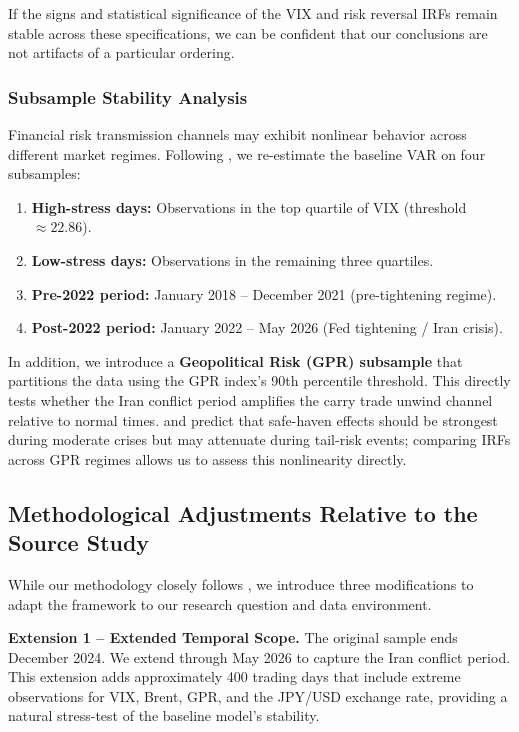 \documentclass[12pt]{article}
\begin{document}
{} If the signs and statistical significance of the VIX and risk reversal IRFs remain stable across these specifications, we can be confident that our conclusions are not artifacts of a particular ordering.

\subsubsection{Subsample Stability Analysis}

{} Financial risk transmission channels may exhibit nonlinear behavior across different market regimes. Following \textcite{guyot2026risk}, we re-estimate the baseline VAR on four subsamples:

\begin{enumerate}
  \item \textbf{High-stress days:} Observations in the top quartile of VIX (threshold $\approx 22.86$).
  \item \textbf{Low-stress days:} Observations in the remaining three quartiles.
  \item \textbf{Pre-2022 period:} January 2018 -- December 2021 (pre-tightening regime).
  \item \textbf{Post-2022 period:} January 2022 -- May 2026 (Fed tightening / Iran crisis).
\end{enumerate}

{} In addition, we introduce a \textbf{Geopolitical Risk (GPR) subsample} that partitions the data using the GPR index's 90th percentile threshold. This directly tests whether the Iran conflict period amplifies the carry trade unwind channel relative to normal times. \textcite{habib2012getting} and \textcite{lee2017safe} predict that safe-haven effects should be strongest during moderate crises but may attenuate during tail-risk events; comparing IRFs across GPR regimes allows us to assess this nonlinearity directly.

\subsection{Methodological Adjustments Relative to the Source Study}

{} While our methodology closely follows \textcite{guyot2026risk}, we introduce three modifications to adapt the framework to our research question and data environment.

\textbf{Extension 1 -- Extended Temporal Scope.} The original sample ends December 2024. We extend through May 2026 to capture the Iran conflict period. This extension adds approximately 400 trading days that include extreme observations for VIX, Brent, GPR, and the JPY/USD exchange rate, providing a natural stress-test of the baseline model's stability.
\end{document}
